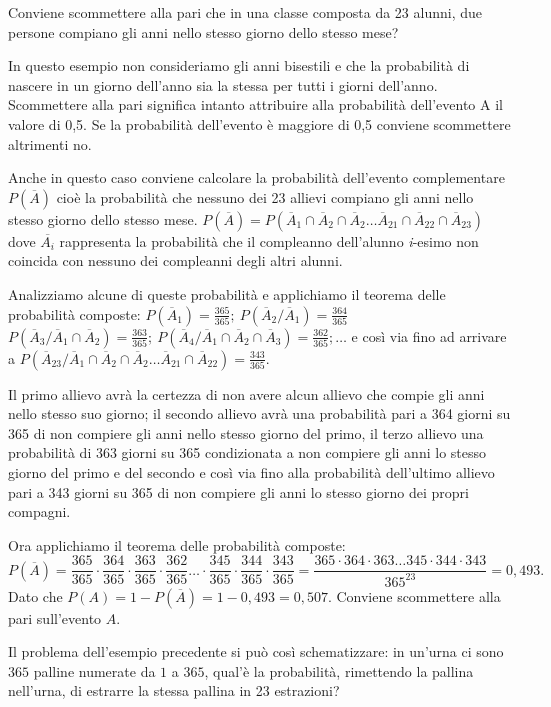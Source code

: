 \begin{esempio}
Conviene scommettere alla pari che in una classe composta da 23 alunni, due 
persone compiano gli anni nello stesso giorno dello stesso mese?

In questo esempio non consideriamo gli anni bisestili e che la probabilità di 
nascere in un giorno dell'anno sia la stessa per tutti i giorni dell'anno. 
Scommettere alla pari significa intanto attribuire alla probabilità dell'evento 
A il valore di 0,5. Se la probabilità dell'evento è maggiore di 0,5 conviene 
scommettere altrimenti no.

Anche in questo caso conviene calcolare la probabilità dell'evento 
complementare 
$P(\overline A)$ cioè la probabilità che nessuno dei 23 allievi compiano gli 
anni nello stesso giorno dello stesso mese. $P(\overline A)=P(\overline A_1\cap 
\overline A_2\cap \overline A_2\ldots \overline A_{21}\cap \overline A_{22}\cap 
\overline A_{23})$ dove $\overline{A_i}$ rappresenta la probabilità che il 
compleanno dell'alunno \emph{i}{}-esimo non coincida con nessuno dei compleanni 
degli altri alunni.

Analizziamo alcune di queste probabilità e applichiamo il teorema delle 
probabilità composte: $P(\overline A_1)=\frac{365}{365};\ P(\overline 
A_2/\overline A_1)=\frac{364}{365}$ $P(\overline A_3/\overline A_1\cap 
\overline 
A_2)=\frac{363}{365};\ P(\overline A_4/\overline A_1\cap \overline A_2\cap 
\overline A_3)=\frac{362}{365};\ldots $ e così via fino ad arrivare a 
$P(\overline A_{23}/\overline A_1\cap \overline A_2\cap \overline A_2\ldots 
\overline A_{21}\cap \overline A_{22})=\frac{343}{365}$.

Il primo allievo avrà la certezza di non avere alcun allievo che compie gli 
anni 
nello stesso suo giorno; il secondo allievo avrà una probabilità pari a 364 
giorni su 365 di non compiere gli anni nello stesso giorno del primo, il terzo 
allievo una probabilità di 363 giorni su 365 condizionata a non compiere gli 
anni lo stesso giorno del primo e del secondo e così via fino alla probabilità 
dell'ultimo allievo pari a 343 giorni su 365 di non compiere gli anni lo stesso 
giorno dei propri compagni.

Ora applichiamo il teorema delle probabilità composte: \[ P(\overline 
A)=\frac{365}{365}\cdot \frac{364}{365}\cdot \frac{363}{365}\cdot 
\frac{362}{365}\ldots \cdot \frac{345}{365}\cdot \frac{344}{365}\cdot 
\frac{343}{365}=\frac{365\cdot 364\cdot 363\ldots 345 \cdot 344\cdot 
343}{365^{23}}=0,493. \] Dato che $P(A)=1-P(\overline A)=1-0,493=0,507$.
\conclusione Conviene scommettere alla pari sull'evento $ A $.
\end{esempio}
Il problema dell'esempio precedente si può così schematizzare: in un'urna ci 
sono $ 365 $ palline numerate da $ 1 $ a $ 365 $, qual'è la probabilità, 
rimettendo la pallina nell'urna, di estrarre la stessa pallina in 23 estrazioni?


